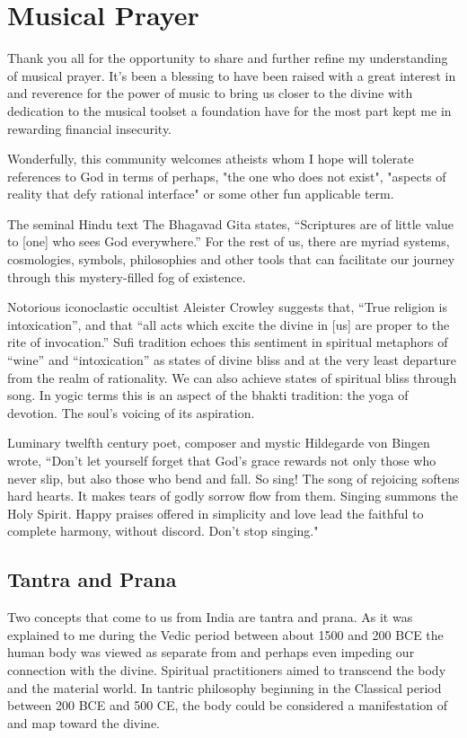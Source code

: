 \documentclass[12pt]{article}
\begin{document}
\section*{Musical Prayer}

Thank you all for  the opportunity to share and further refine my understanding of musical prayer. It's been a blessing to have been raised with a great interest in and reverence for the power of music to bring us closer to the divine with dedication to the musical toolset a foundation have for the most part kept me in rewarding financial insecurity.

Wonderfully, this community welcomes atheists whom I hope will tolerate references to God in terms of perhaps, "the one who does not exist", "aspects of reality that defy rational interface" or some other fun applicable term.

The seminal Hindu text The Bhagavad Gita states, “Scriptures are of little value to [one] who sees God everywhere.” For the rest of us, there are myriad systems, cosmologies, symbols, philosophies and other tools that can facilitate our journey through this mystery-filled fog of existence.

Notorious iconoclastic occultist Aleister Crowley suggests that, “True religion is intoxication”, and that “all acts which excite the divine in [us] are proper to the rite of invocation.” Sufi tradition echoes this sentiment in spiritual metaphors of “wine” and “intoxication” as states of divine bliss and at the very least departure from the realm of rationality. We can also achieve states of spiritual bliss through song. In yogic terms this is an aspect of the bhakti tradition: the yoga of devotion. The soul’s voicing of its aspiration.

Luminary twelfth century poet, composer and mystic Hildegarde von Bingen wrote, “Don't let yourself forget that God's grace rewards not only those who never slip, but also those who bend and fall. So sing! The song of rejoicing softens hard hearts. It makes tears of godly sorrow flow from them. Singing summons the Holy Spirit. Happy praises offered in simplicity and love lead the faithful to complete harmony, without discord. Don't stop singing."

\subsection*{Tantra and Prana}

Two concepts that come to us from India are tantra and prana. As it was explained to me during the Vedic period between about 1500 and 200 BCE the human body was viewed as separate from and perhaps even impeding our connection with the divine. Spiritual practitioners aimed to transcend the body and the material world. In tantric philosophy beginning in the Classical period between 200 BCE and 500 CE, the body could be considered a manifestation of and map toward the divine.
\end{document}
